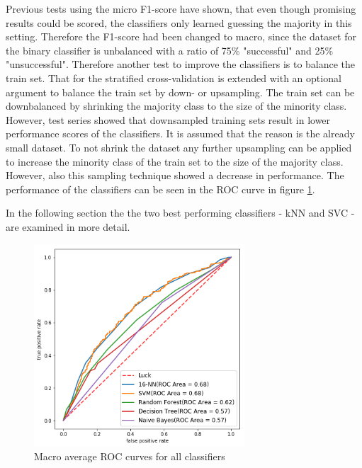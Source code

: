 Previous tests using the micro F1-score have shown, that even though promising results could be scored, the classifiers only learned guessing the majority in this setting. Therefore the F1-score had been changed to macro,
 since the dataset for the binary classifier is unbalanced with a ratio of 75\% "successful" and 25\% "unsuccessful". Therefore another test to improve the classifiers is to balance the train set.
That for the stratified cross-validation is extended with an optional argument to balance the train set by down- or upsampling.
The train set can be downbalanced by shrinking the majority class to the size of the minority class. However, test series showed that downsampled training sets result in lower performance scores of the classifiers. It is assumed that the reason is the already small dataset.
To not shrink the dataset any further upsampling can be applied to increase the minority class of the train set to the size of the majority class. However, also this sampling technique showed a decrease in performance.
The performance of the classifiers can be seen in the ROC curve in figure \ref{img:roc}.

In the following section the the two best performing classifiers - kNN and SVC - are examined in more detail.
\begin{figure}[h]
	\center
	\includegraphics[width=0.7\textwidth]{images/roc.png}
	\caption{Macro average ROC curves for all classifiers}
	\label{img:roc}
\end{figure}


